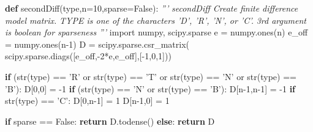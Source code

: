\documentclass[12pt,]{book}
\newenvironment{Shaded}{}{}
\newcommand{\KeywordTok}[1]{\textcolor[rgb]{0.00,0.44,0.13}{\textbf{{#1}}}}
\newcommand{\DecValTok}[1]{\textcolor[rgb]{0.25,0.63,0.44}{{#1}}}
\newcommand{\StringTok}[1]{\textcolor[rgb]{0.25,0.44,0.63}{{#1}}}
\newcommand{\ImportTok}[1]{{#1}}
\newcommand{\CommentTok}[1]{\textcolor[rgb]{0.38,0.63,0.69}{\textit{{#1}}}}
\newcommand{\VariableTok}[1]{\textcolor[rgb]{0.10,0.09,0.49}{{#1}}}
\newcommand{\ControlFlowTok}[1]{\textcolor[rgb]{0.00,0.44,0.13}{\textbf{{#1}}}}
\newcommand{\OperatorTok}[1]{\textcolor[rgb]{0.40,0.40,0.40}{{#1}}}
\newcommand{\BuiltInTok}[1]{{#1}}
\newcommand{\NormalTok}[1]{{#1}}
\begin{document}
\begin{Shaded}
\begin{Highlighting}[]
\KeywordTok{def} \NormalTok{secondDiff(}\BuiltInTok{type}\NormalTok{,n}\OperatorTok{=}\DecValTok{10}\NormalTok{,sparse}\OperatorTok{=}\VariableTok{False}\NormalTok{):}
    \CommentTok{'''}
\CommentTok{    secondDiff Create finite difference model matrix.}
\CommentTok{    TYPE is one of the characters 'D', 'R', 'N', or 'C'.}
\CommentTok{    3rd argument is boolean for sparseness}
\CommentTok{    '''}
    \ImportTok{import} \NormalTok{numpy, scipy.sparse}
    \NormalTok{e }\OperatorTok{=} \NormalTok{numpy.ones(n)}
    \NormalTok{e_off }\OperatorTok{=} \NormalTok{numpy.ones(n}\DecValTok{-1}\NormalTok{)}
    \NormalTok{D }\OperatorTok{=} \NormalTok{scipy.sparse.csr_matrix(}
      \NormalTok{scipy.sparse.diags([e_off,}\OperatorTok{-}\DecValTok{2}\OperatorTok{*}\NormalTok{e,e_off],[}\OperatorTok{-}\DecValTok{1}\NormalTok{,}\DecValTok{0}\NormalTok{,}\DecValTok{1}\NormalTok{]))}

    \ControlFlowTok{if} \NormalTok{(}\BuiltInTok{str}\NormalTok{(}\BuiltInTok{type}\NormalTok{) }\OperatorTok{==} \StringTok{'R'} \OperatorTok{or} \BuiltInTok{str}\NormalTok{(}\BuiltInTok{type}\NormalTok{) }\OperatorTok{==} \StringTok{'T'} \OperatorTok{or}
        \BuiltInTok{str}\NormalTok{(}\BuiltInTok{type}\NormalTok{) }\OperatorTok{==} \StringTok{'N'} \OperatorTok{or} \BuiltInTok{str}\NormalTok{(}\BuiltInTok{type}\NormalTok{) }\OperatorTok{==} \StringTok{'B'}\NormalTok{):}
        \NormalTok{D[}\DecValTok{0}\NormalTok{,}\DecValTok{0}\NormalTok{] }\OperatorTok{=} \OperatorTok{-}\DecValTok{1}
    \ControlFlowTok{if} \NormalTok{(}\BuiltInTok{str}\NormalTok{(}\BuiltInTok{type}\NormalTok{) }\OperatorTok{==} \StringTok{'N'} \OperatorTok{or} \BuiltInTok{str}\NormalTok{(}\BuiltInTok{type}\NormalTok{) }\OperatorTok{==} \StringTok{'B'}\NormalTok{):}
        \NormalTok{D[n}\DecValTok{-1}\NormalTok{,n}\DecValTok{-1}\NormalTok{] }\OperatorTok{=} \OperatorTok{-}\DecValTok{1}
    \ControlFlowTok{if} \BuiltInTok{str}\NormalTok{(}\BuiltInTok{type}\NormalTok{) }\OperatorTok{==} \StringTok{'C'}\NormalTok{:}
        \NormalTok{D[}\DecValTok{0}\NormalTok{,n}\DecValTok{-1}\NormalTok{] }\OperatorTok{=} \DecValTok{1}
        \NormalTok{D[n}\DecValTok{-1}\NormalTok{,}\DecValTok{0}\NormalTok{] }\OperatorTok{=} \DecValTok{1}

    \ControlFlowTok{if} \NormalTok{sparse }\OperatorTok{==} \VariableTok{False}\NormalTok{: }\ControlFlowTok{return} \NormalTok{D.todense()}
    \ControlFlowTok{else}\NormalTok{: }\ControlFlowTok{return} \NormalTok{D}
\end{Highlighting}
\end{Shaded}
\end{document}
